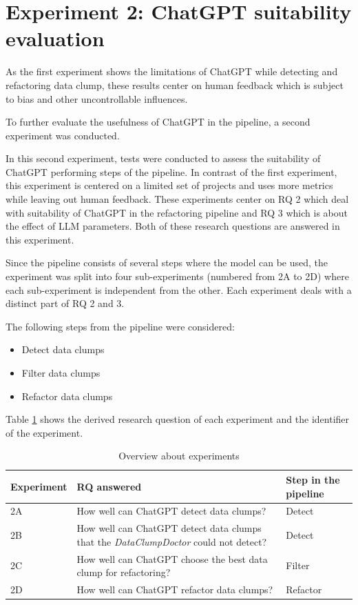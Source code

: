 
\newcommand{\dolphinscheduler}{\textit{DolphinScheduler}}
\newcommand{\rocketmq}{\textit{RocketMQ}}
\newcommand{\argouml}{\textit{ArgoUML}}

\section{Experiment 2: ChatGPT suitability evaluation}\label{sec:metric_based_eval}

As the first experiment shows the limitations of ChatGPT while detecting and refactoring data clump, these results center on human feedback which is subject to bias and other uncontrollable influences. 

To further evaluate the usefulness of ChatGPT in the pipeline, a second experiment was conducted.

In this second experiment, tests were conducted to assess the suitability of ChatGPT performing steps of the pipeline. In contrast of the first experiment, this experiment is centered on a limited set of projects and uses more metrics while leaving out human feedback. These experiments center on RQ 2 which deal with suitability of ChatGPT in the refactoring pipeline and RQ 3 which is about the effect of \ac{LLM} parameters. Both of these research questions are answered in this experiment. 

Since the pipeline consists of several steps where the model can be used, the experiment was split into  four sub-experiments (numbered from 2A to 2D) where each sub-experiment is independent from the other. Each experiment deals with a distinct part of RQ 2 and 3. 

The following steps from the pipeline were considered:

\begin{itemize}
    \item Detect data clumps
    \item Filter data clumps
    \item Refactor data clumps
\end{itemize}

Table \ref{tbl:expB} shows the derived research question of each experiment and the identifier of the experiment. 
\begin{table}[ht!]
    \centering
    \begin{tabular}{m{2cm}|m{10cm}| m{2cm}}
      Experiment   & RQ answered & Step in the pipeline  \\\hline
        2A & How well can ChatGPT detect data clumps? & Detect  \\\hline
        2B & How well can ChatGPT detect data clumps that the \textit{DataClumpDoctor} could not detect? & Detect \\\hline
        2C & How well can ChatGPT choose the best data clump for refactoring? & Filter \\\hline
        2D & How well can ChatGPT  refactor data clumps? & Refactor \\\hline
    \end{tabular}
    \caption{Overview about experiments}
    \label{tbl:expB}
\end{table}

